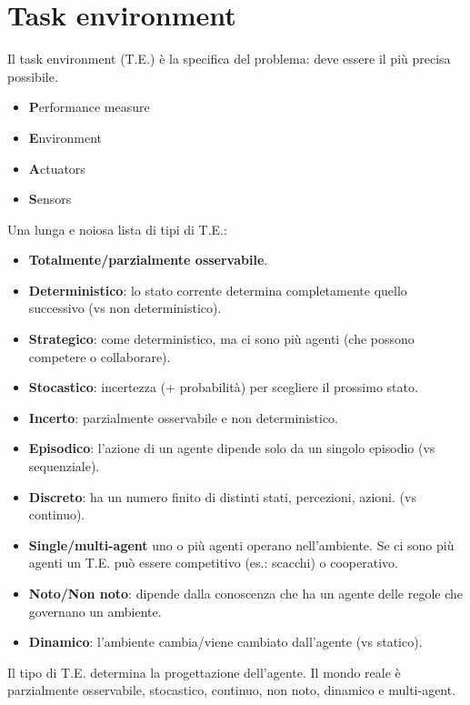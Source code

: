 \newpage

\section{Task environment}

Il task environment (T.E.) è la specifica del problema: deve essere il più precisa
possibile.

\begin{itemize}
 \item \textbf{P}erformance measure
 \item \textbf{E}nvironment
 \item \textbf{A}ctuators
 \item \textbf{S}ensors
\end{itemize}

Una lunga e noiosa lista di tipi di T.E.:

\begin{itemize}
 \item \textbf{Totalmente/parzialmente osservabile}.
 \item \textbf{Deterministico}: lo stato corrente determina completamente
quello successivo (vs non deterministico).
 \item \textbf{Strategico}: come deterministico, ma ci sono più agenti (che
possono competere o collaborare).
 \item \textbf{Stocastico}: incertezza (+ probabilità) per scegliere il
prossimo stato.
 \item \textbf{Incerto}: parzialmente osservabile e non deterministico.
 \item \textbf{Episodico}: l'azione di un agente dipende solo da un singolo
episodio (vs sequenziale).
 \item \textbf{Discreto}: ha un numero finito di distinti stati, percezioni,
azioni. (vs continuo).
 \item \textbf{Single/multi-agent} uno o più agenti operano nell'ambiente. Se
ci sono più agenti un T.E. può essere competitivo (es.: scacchi) o cooperativo.
 \item \textbf{Noto/Non noto}: dipende dalla conoscenza che ha un agente delle
regole che governano un ambiente.
 \item \textbf{Dinamico}: l'ambiente cambia/viene cambiato dall'agente (vs
statico).
\end{itemize}

Il tipo di T.E. determina la progettazione dell'agente.
Il mondo reale è parzialmente osservabile, stocastico, continuo, non noto,
dinamico e multi-agent.



